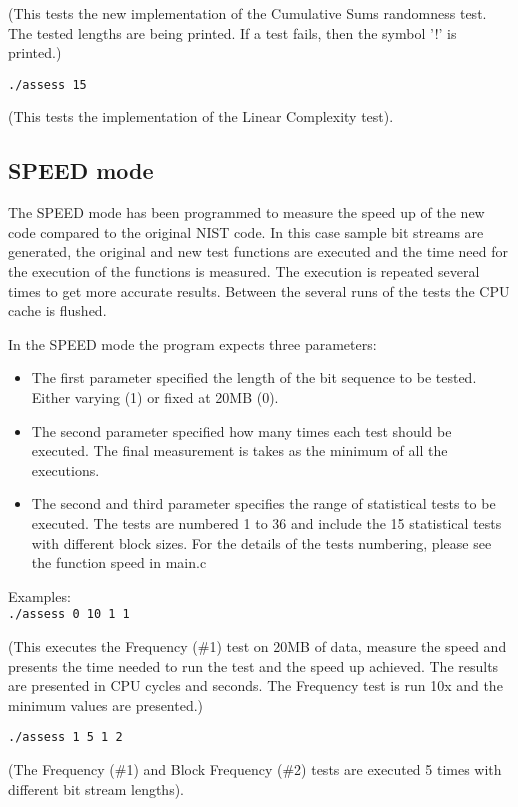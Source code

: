 \documentclass[12pt]{article}
\begin{document}
\smallskip
(This tests the new implementation of the Cumulative Sums randomness test. The tested lengths are being printed. If a test fails, then the symbol '!' is printed.)

\smallskip
\verb+./assess 15+

\smallskip
(This tests the implementation of the Linear Complexity test).

\subsection*{SPEED mode}

The SPEED mode has been programmed to measure the speed up of the new code compared to the original NIST code. In this case sample bit streams are generated, the original and new test functions are executed and the time need for the execution of the functions is measured. The execution is repeated several times to get more accurate results. Between the several runs of the tests the CPU cache is flushed.

\medskip
In the SPEED mode the program expects three parameters:

\begin{itemize}
\setlength\itemsep{-3pt}
\item The first parameter specified the length of the bit sequence to be tested. Either varying (1) or fixed at 20MB (0).
\item The second parameter specified how many times each test should be executed. The final measurement is takes as the minimum of all the executions.
\item The second and third parameter specifies the range of statistical tests to be executed. The tests are numbered 1 to 36 and include the 15 statistical tests with different block sizes. For the details of the tests numbering, please see the function speed in main.c
\end{itemize}

Examples:\\
\verb|./assess 0 10 1 1|

\smallskip
(This executes the Frequency (\#1) test on 20MB of data, measure the speed and presents the time needed to run the test and the speed up achieved. The results are presented in CPU cycles and seconds. The Frequency test is run 10x and the minimum values are presented.)

\medskip
\verb|./assess 1 5 1 2|

\smallskip
(The Frequency (\#1) and Block Frequency (\#2) tests are executed 5 times with different bit stream lengths).
\end{document}
